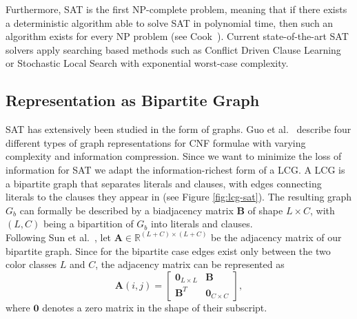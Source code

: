Furthermore, SAT is the first NP-complete problem, meaning that if there exists a deterministic algorithm able to solve SAT in polynomial time, then such an algorithm exists for every NP problem (see Cook~\cite{cook2023complexity}). Current state-of-the-art SAT solvers apply searching based methods such as Conflict Driven Clause Learning \cite{marques1999grasp} or Stochastic Local Search \cite{selman1993local} with exponential worst-case complexity.

\subsection{Representation as Bipartite Graph}
SAT has extensively been studied in the form of graphs. Guo et al.~\cite{guo2023machine} describe four different types of graph representations for CNF formulae with varying complexity and information compression. Since we want to minimize the loss of information for SAT we adapt the information-richest form of a \ac{LCG}. 
A LCG is a bipartite graph that separates literals and clauses, with edges connecting literals to the clauses they appear in (see Figure \ref{fig:lcg-sat}).
The resulting graph $G_b$ can formally be described by a biadjacency matrix $\mathbf{B}$ of shape $L \times C$, with $(L,C)$ being a bipartition of $G_b$ into literals and clauses. \\
Following Sun et al.~\cite{articleBiadjacency}, let $\mathbf{A} \in \mathbb{R}^{(L+C) \times (L+C)}$ be the adjacency matrix of our bipartite graph. Since for the bipartite case edges exist only between the two color classes $L$ and $C$, the adjacency matrix can be represented as
\begin{equation}
    \mathbf{A}(i,j) = \begin{bmatrix}
        \mathbf{0}_{L \times L} & \mathbf{B} \\
        \mathbf{B}^T & \mathbf{0}_{C \times C}
    \end{bmatrix},
\end{equation}
where $\mathbf{0}$ denotes a zero matrix in the shape of their subscript. \bigskip

